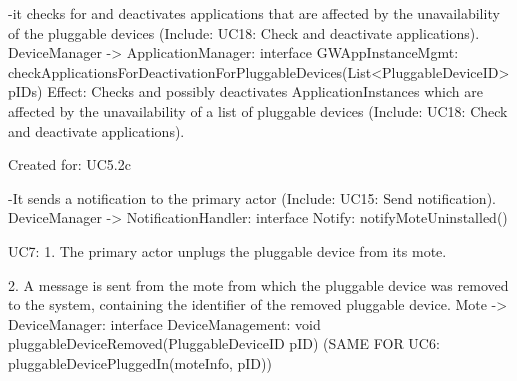             -it checks for and deactivates applications that are affected by the unavailability of the pluggable devices (Include: UC18: Check and deactivate applications).
                DeviceManager -> ApplicationManager: interface GWAppInstanceMgmt: checkApplicationsForDeactivationForPluggableDevices(List<PluggableDeviceID> pIDs)
                    Effect: Checks and possibly deactivates ApplicationInstances which are affected by the unavailability of a list of pluggable devices (Include: UC18: Check and deactivate applications).
                    \item Created for: UC5.2c

            -It sends a notification to the primary actor (Include: UC15: Send notification).
                DeviceManager -> NotificationHandler: interface Notify: notifyMoteUninstalled()


    UC7:
        1. The primary actor unplugs the pluggable device from its mote.

        2. A message is sent from the mote from which the pluggable device was removed to the system,
           containing the identifier of the removed pluggable device.
            Mote -> DeviceManager: interface DeviceManagement: void pluggableDeviceRemoved(PluggableDeviceID pID)
            (SAME FOR UC6: pluggableDevicePluggedIn(moteInfo, pID))

